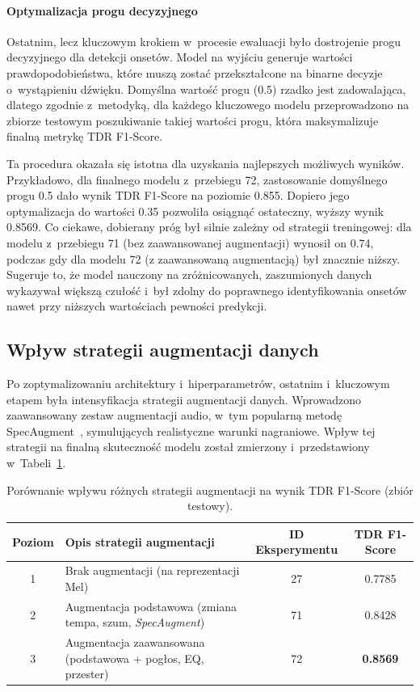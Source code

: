 \paragraph{Optymalizacja progu decyzyjnego}
Ostatnim, lecz kluczowym krokiem w~procesie ewaluacji było dostrojenie progu decyzyjnego dla detekcji onsetów. Model na wyjściu generuje wartości prawdopodobieństwa, które muszą zostać przekształcone na binarne decyzje o~wystąpieniu dźwięku. Domyślna wartość progu (0.5) rzadko jest zadowalająca, dlatego zgodnie z~metodyką, dla każdego kluczowego modelu przeprowadzono na zbiorze testowym poszukiwanie takiej wartości progu, która maksymalizuje finalną metrykę TDR F1-Score.

Ta procedura okazała się istotna dla uzyskania najlepszych możliwych wyników. Przykładowo, dla finalnego modelu z~przebiegu 72, zastosowanie domyślnego progu 0.5 dało wynik TDR F1-Score na poziomie 0.855. Dopiero jego optymalizacja do wartości 0.35 pozwoliła osiągnąć ostateczny, wyższy wynik 0.8569. Co ciekawe, dobierany próg był silnie zależny od strategii treningowej: dla modelu z~przebiegu 71 (bez zaawansowanej augmentacji) wynosił on 0.74, podczas gdy dla modelu 72 (z zaawansowaną augmentacją) był znacznie niższy. Sugeruje to, że model nauczony na zróżnicowanych, zaszumionych danych wykazywał większą czułość i~był zdolny do poprawnego identyfikowania onsetów nawet przy niższych wartościach pewności predykcji.

\subsection{Wpływ strategii augmentacji danych}
\label{ssec:wplyw_augmentacji}

Po zoptymalizowaniu architektury i~hiperparametrów, ostatnim i~kluczowym etapem była intensyfikacja strategii augmentacji danych. Wprowadzono zaawansowany zestaw augmentacji audio, w~tym popularną metodę SpecAugment~\autocite{Park2019SpecAugment}, symulujących realistyczne warunki nagraniowe. Wpływ tej strategii na finalną skuteczność modelu został zmierzony i~przedstawiony w~Tabeli~\ref{tab:wplyw_augmentacji}.

\begin{table}[H]
    \centering
    \caption{Porównanie wpływu różnych strategii augmentacji na wynik TDR F1-Score (zbiór testowy).}
    \label{tab:wplyw_augmentacji}
    \begin{tabularx}{\textwidth}{|c|X|c|c|}
        \hline
        \textbf{Poziom} & \textbf{Opis strategii augmentacji} & \textbf{ID Eksperymentu} & \textbf{TDR F1-Score } \\ \hline
        1 & Brak augmentacji (na reprezentacji Mel) & 27 & 0.7785 \\ \hline
        2 & Augmentacja podstawowa (zmiana tempa, szum, \textit{SpecAugment}) & 71 & 0.8428 \\ \hline
        3 & Augmentacja zaawansowana (podstawowa + pogłos, EQ, przester) & 72 & \textbf{0.8569} \\ \hline
    \end{tabularx}
\end{table}

